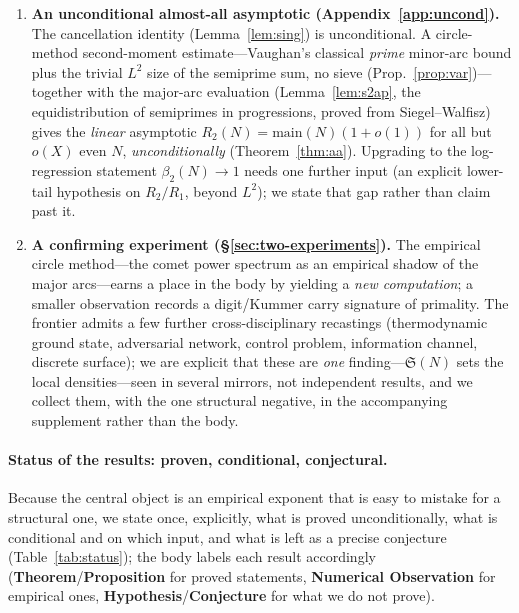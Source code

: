\documentclass[]{interact}%
\newcommand{\sing}{\mathfrak S}
\begin{document}
\begin{enumerate}[leftmargin=2em,itemsep=2pt]
\item \textbf{An unconditional almost-all asymptotic (Appendix~\ref{app:uncond}).} The cancellation identity (Lemma~\ref{lem:sing}) is unconditional. A circle-method second-moment estimate---Vaughan's classical \emph{prime} minor-arc bound plus the trivial $L^2$ size of the semiprime sum, no sieve (Prop.~\ref{prop:var})---together with the major-arc evaluation (Lemma~\ref{lem:s2ap}, the equidistribution of semiprimes in progressions, proved from Siegel--Walfisz) gives the \emph{linear} asymptotic $R_2(N)=\mathrm{main}(N)(1+o(1))$ for all but $o(X)$ even $N$, \emph{unconditionally} (Theorem~\ref{thm:aa}). Upgrading to the log-regression statement $\beta_2(N)\to1$ needs one further input (an explicit lower-tail hypothesis on $R_2/R_1$, beyond $L^2$); we state that gap rather than claim past it.
\item \textbf{A confirming experiment (\S\ref{sec:two-experiments}).} The empirical circle method---the comet power spectrum as an empirical shadow of the major arcs---earns a place in the body by yielding a \emph{new computation}; a smaller observation records a digit/Kummer carry signature of primality. The frontier admits a few further cross-disciplinary recastings (thermodynamic ground state, adversarial network, control problem, information channel, discrete surface); we are explicit that these are \emph{one} finding---$\sing(N)$ sets the local densities---seen in several mirrors, not independent results, and we collect them, with the one structural negative, in the accompanying supplement rather than the body.
\end{enumerate}

\paragraph{Status of the results: proven, conditional, conjectural.}
Because the central object is an empirical exponent that is easy to mistake for a structural
one, we state once, explicitly, what is proved unconditionally, what is conditional and on
which input, and what is left as a precise conjecture (Table~\ref{tab:status}); the body labels
each result accordingly (\textbf{Theorem}/\textbf{Proposition} for proved statements,
\textbf{Numerical Observation} for empirical ones, \textbf{Hypothesis}/\textbf{Conjecture} for
what we do not prove).
\end{document}
